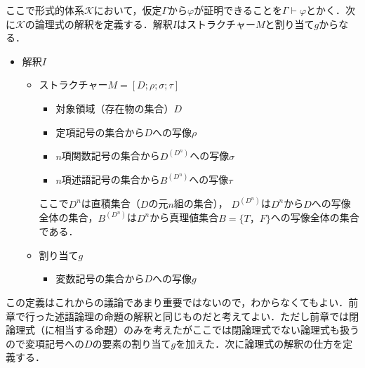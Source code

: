 \documentclass[10pt,b5paper,papersize,dvipdfmx]{jsbook}
\begin{document}
ここで形式的体系$\mathcal K$において，仮定$\Gamma$から$\varphi$が証明できることを$\Gamma \vdash \varphi$とかく．次に$\mathcal K$の論理式の解釈を定義する．解釈$I$はストラクチャー$M$と割り当て$g$からなる．
\begin{itemize}
\item 解釈$I$
\begin{itemize}
\item ストラクチャー$M=[D;\rho;\sigma;\tau]$
\begin{itemize}
\item 対象領域（存在物の集合）$D$
\item 定項記号の集合から$D$への写像$\rho$
\item $n$項関数記号の集合から$D^{(D^n)}$への写像$\sigma$
\item $n$項述語記号の集合から$B^{(D^n)}$への写像$\tau$
\end{itemize}
ここで$D^n$は直積集合（$D$の元$n$組の集合）， $D^{(D^n)}$は$D^n$から$D$への写像全体の集合，$B^{(D^n)}$は$D^n$から真理値集合$B=\{T，F\}$への写像全体の集合である．
\item 割り当て$g$
\begin{itemize}
\item 変数記号の集合から$D$への写像$g$
\end{itemize}
\end{itemize}
\end{itemize}
この定義はこれからの議論であまり重要ではないので，わからなくてもよい．前章で行った述語論理の命題の解釈と同じものだと考えてよい．ただし前章では閉論理式（に相当する命題）のみを考えたがここでは閉論理式でない論理式も扱うので変項記号への$D$の要素の割り当て$g$を加えた．次に論理式の解釈の仕方を定義する．
\end{document}
